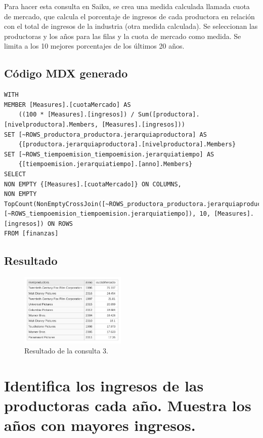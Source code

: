 \documentclass[11pt]{opticajnl}
\begin{document}
Para hacer esta consulta en Saiku, se crea una medida calculada llamada cuota de mercado, que calcula el porcentaje de ingresos de cada productora en relación con el total de ingresos de la industria (otra medida calculada). Se seleccionan las productoras y los años para las filas y la cuota de mercado como medida. Se limita a los 10 mejores porcentajes de los últimos 20 años.

\subsection{Código MDX generado}

\begin{lstlisting}[style=terminal]
WITH
MEMBER [Measures].[cuotaMercado] AS
	((100 * [Measures].[ingresos]) / Sum([productora].[nivelproductora].Members, [Measures].[ingresos]))
SET [~ROWS_productora_productora.jerarquiaproductora] AS
	{[productora.jerarquiaproductora].[nivelproductora].Members}
SET [~ROWS_tiempoemision_tiempoemision.jerarquiatiempo] AS
	{[tiempoemision.jerarquiatiempo].[anno].Members}
SELECT
NON EMPTY {[Measures].[cuotaMercado]} ON COLUMNS,
NON EMPTY TopCount(NonEmptyCrossJoin([~ROWS_productora_productora.jerarquiaproductora], [~ROWS_tiempoemision_tiempoemision.jerarquiatiempo]), 10, [Measures].[ingresos]) ON ROWS
FROM [finanzas]
\end{lstlisting}

\subsection{Resultado}

\begin{figure}[h]
\centering
\includegraphics[width=0.45\textwidth]{fotos/con3.jpg}
\caption{Resultado de la consulta 3.}
\end{figure}

\newpage

\section{Identifica los ingresos de las productoras cada año. Muestra los años con mayores ingresos.}
\end{document}
